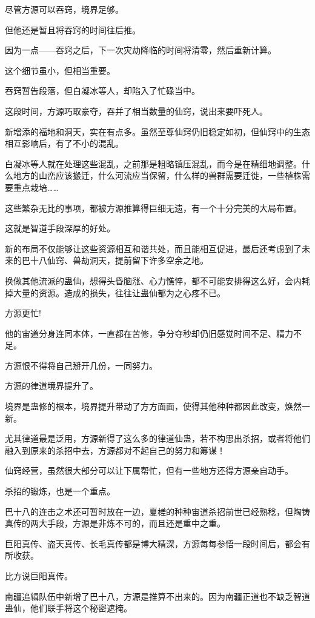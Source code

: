 \begin{this_body}
尽管方源可以吞窍，境界足够。

但他还是暂且将吞窍的时间往后推。

因为一点——吞窍之后，下一次灾劫降临的时间将清零，然后重新计算。

这个细节虽小，但相当重要。

吞窍暂告段落，但白凝冰等人，却陷入了忙碌当中。

这段时间，方源巧取豪夺，吞并了相当数量的仙窍，说出来要吓死人。

新增添的福地和洞天，实在有点多。虽然至尊仙窍仍旧稳定如初，但仙窍中的生态相互影响后，有了不小的混乱。

白凝冰等人就在处理这些混乱，之前那是粗略镇压混乱，而今是在精细地调整。什么地方的山峦应该搬迁，什么河流应当保留，什么样的兽群需要迁徙，一些植株需要重点栽培……

这些繁杂无比的事项，都被方源推算得巨细无遗，有一个十分完美的大局布置。

这就是智道手段深厚的好处。

新的布局不仅能够让这些资源相互和谐共处，而且能相互促进，最后还考虑到了未来的巴十八仙窍、兽劫洞天，提前留下许多空余之地。

换做其他流派的蛊仙，想得头昏脑涨、心力憔悴，都不可能安排得这么好，会内耗掉大量的资源。造成的损失，往往让蛊仙都为之心疼不已。

方源更忙!

他的宙道分身连同本体，一直都在苦修，争分夺秒却仍旧感觉时间不足、精力不足。

方源恨不得将自己掰开几份，一同努力。

方源的律道境界提升了。

境界是蛊修的根本，境界提升带动了方方面面，使得其他种种都因此改变，焕然一新。

尤其律道最是泛用，方源新得了这么多的律道仙蛊，若不构思出杀招，或者将他们融入到原来的杀招中去，方源都对不起自己的努力和筹谋！

仙窍经营，虽然很大部分可以让下属帮忙，但有一些地方还得方源亲自动手。

杀招的锻炼，也是一个重点。

巴十八的连击之术还可暂时放在一边，夏槎的种种宙道杀招前世已经熟稔，但陶铸真传的两大手段，方源是非炼不可的，而且还是重中之重。

巨阳真传、盗天真传、长毛真传都是博大精深，方源每每参悟一段时间后，都会有所收获。

比方说巨阳真传。

南疆追辑队伍中新增了巴十八，方源是推算不出来的。因为南疆正道也不缺乏智道蛊仙，他们联手将这个秘密遮掩。


\end{this_body}
